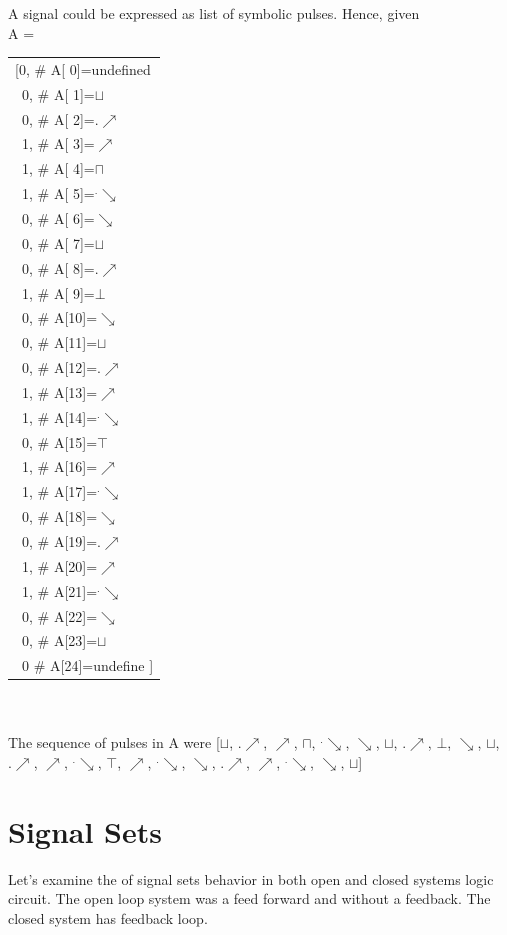 \documentclass[10pt,journal]{IEEEtran}
\begin{document}
A signal could be expressed as list of symbolic pulses. Hence, given \\ 
A = \begin{tabular}{p{6cm}}      [0,  \#  A[ 0]=undefined\\       \ 0,  \#  A[ 1]=$\sqcup$\\       \ 0,  \#  A[ 2]=$.\nearrow$\\       \ 1,  \#  A[ 3]=$\nearrow$\\       \ 1,  \#  A[ 4]=$\sqcap$\\       \ 1,  \#  A[ 5]=$^.\searrow$\\       \ 0,  \#  A[ 6]=$\searrow$\\       \ 0,  \#  A[ 7]=$\sqcup$\\       \ 0,  \#  A[ 8]=$.\nearrow$\\       \ 1,  \#  A[ 9]=$\bot$\\       \ 0,  \#  A[10]=$\searrow$\\       \ 0,  \#  A[11]=$\sqcup$\\       \ 0,  \#  A[12]=$.\nearrow$\\       \ 1,  \#  A[13]=$\nearrow$\\       \ 1,  \#  A[14]=$^.\searrow$\\       \ 0,  \#  A[15]=$\top$\\       \ 1,  \#  A[16]=$\nearrow$\\       \ 1,  \#  A[17]=$^.\searrow$\\       \ 0,  \#  A[18]=$\searrow$\\       \ 0,  \#  A[19]=$.\nearrow$\\       \ 1,  \#  A[20]=$\nearrow$\\       \ 1,  \#  A[21]=$^.\searrow$\\       \ 0,  \#  A[22]=$\searrow$\\       \ 0,  \#  A[23]=$\sqcup$\\       \ 0   \#  A[24]=undefine ]        \end{tabular} \\ \ \\ 
The sequence of pulses in A were [$\sqcup$, $.\nearrow$, $\nearrow$, $\sqcap$, $^.\searrow$, $\searrow$, $\sqcup$, $.\nearrow$, $\bot$, $\searrow$, $\sqcup$, $.\nearrow$, $\nearrow$, $^.\searrow$, $\top$, $\nearrow$, $^.\searrow$, $\searrow$, $.\nearrow$, $\nearrow$, $^.\searrow$, $\searrow$, $\sqcup$]   
\section{Signal Sets}
Let's examine the of signal sets behavior in both open and closed systems     logic circuit. The open loop system was a feed forward and without a feedback.     The closed system has feedback loop.
\end{document}

